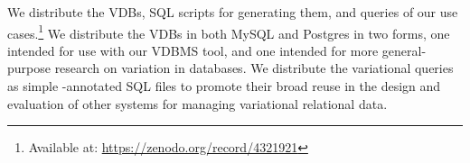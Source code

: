 We distribute the VDBs, SQL scripts for generating them, and queries of our
use cases.\footnote{Available at: \url{https://zenodo.org/record/4321921}}
%
We distribute the VDBs in both MySQL and Postgres in two forms, one intended
for use with our VDBMS tool, and one intended for more general-purpose research
on variation in databases.
%
%
We distribute the variational queries as simple -annotated SQL files
to promote their broad reuse in the design and evaluation of other systems for
managing variational relational data.






